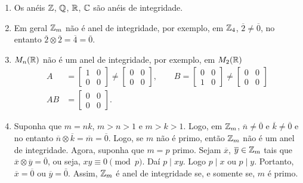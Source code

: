 \begin{exemplos}
    \begin{enumerate}[label={\arabic*})]
        \item Os anéis $\mathbb{Z}$, $\mathbb{Q}$, $\mathbb{R}$, $\mathbb{C}$ são anéis de integridade.

        \item Em geral $\mathbb{Z}_m$ não é anel de integridade, por exemplo, em $\mathbb{Z}_4$, $\overline{2} \neq \overline{0}$, no entanto $\overline{2}\otimes \overline{2} =
            \overline{4} = \overline{0}$.

        \item $M_{n}(\mathbb{R})$ não é um anel de integridade, por exemplo, em $M_{2}(\mathbb{R})$
        \begin{align*}
            A &= \begin{bmatrix}
                1 & 0\\
                0 & 0
            \end{bmatrix} \neq \begin{bmatrix}
                0 & 0\\
                0 & 0
            \end{bmatrix},\qquad
            B = \begin{bmatrix}
                0 & 0\\
                1 & 0
            \end{bmatrix} \neq \begin{bmatrix}
                0 & 0\\
                0 & 0
            \end{bmatrix}\\
            AB & =\begin{bmatrix}
                0 & 0\\
                0 & 0
            \end{bmatrix}.
        \end{align*}

        \item Suponha que $m = nk$, $m > n > 1$ e $m > k > 1$. Logo, em $\mathbb{Z}_m$, $\overline{n} \neq \overline{0}$ e $\overline{k} \neq \overline{0}$ e no entanto $\overline{n}
            \otimes \overline{k} = \overline{m} = \overline{0}$. Logo, se $m$ não é primo, então $\mathbb{Z}_m$ não é um anel de integridade. Agora, suponha que $m =
            p$ primo. Sejam $\overline{x}$, $\overline{y} \in \mathbb{Z}_m$ tais que $\overline{x}\otimes \overline{y} = \overline{0}$, ou seja, $xy \equiv 0 \pmod p$. Daí $p\mid
            xy$. Logo $p\mid x$ ou $p\mid y$. Portanto, $\overline{x} = \overline{0}$ ou $\overline{y} = \bar{0}$. Assim, $\mathbb{Z}_m$ é anel de integridade se, e somente se, $m$
            é primo.
    \end{enumerate}
\end{exemplos}




